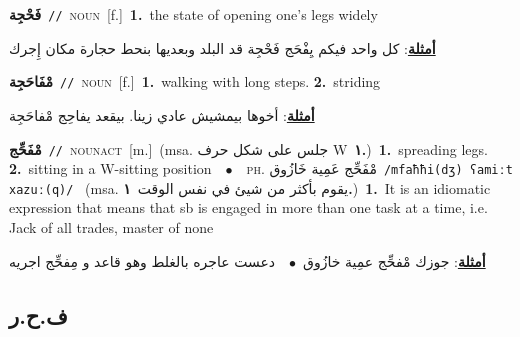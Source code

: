 \documentclass[10pt,a4paper,twoside]{article} %
\begin{document}
\begin{multicols}{2}
{{{{{{{{{{{{{{\setlength\topsep{0pt}\textbf{\foreignlanguage{arabic}{فَحْجِة}}\ {\color{gray}\texttt{//}\color{black}}\ \textsc{noun}\ [f.]\ \textbf{1.}~the state of opening one's legs widely\  \begin{flushright}\color{gray}\foreignlanguage{arabic}{\textbf{\underline{\foreignlanguage{arabic}{أمثلة}}}: كل واحد فيكم يِفْحَج فَحْجِة قد البلد وبعديها بنحط حجارة مكان إِجرك}\end{flushright}\color{black}} \vspace{2mm}

{\setlength\topsep{0pt}\textbf{\foreignlanguage{arabic}{مْفَاحَجِة}}\ {\color{gray}\texttt{//}\color{black}}\ \textsc{noun}\ [f.]\ \textbf{1.}~walking with long steps.  \textbf{2.}~striding\  \begin{flushright}\color{gray}\foreignlanguage{arabic}{\textbf{\underline{\foreignlanguage{arabic}{أمثلة}}}: أخوها بيمشيش عادي زينا. بيقعد يفاحِج مْفاحَجِة}\end{flushright}\color{black}} \vspace{2mm}

{\setlength\topsep{0pt}\textbf{\foreignlanguage{arabic}{مْفَحِّج}}\ {\color{gray}\texttt{//}\color{black}}\ \textsc{noun\textunderscore act}\ [m.]\ \color{gray}(msa. \foreignlanguage{arabic}{جلس على شكل حرف} W~\foreignlanguage{arabic}{\textbf{١.}})\color{black}\ \textbf{1.}~spreading legs.  \textbf{2.}~sitting in a W-sitting position\ \ $\bullet$\ \ \textsc{ph.} \color{gray} \foreignlanguage{arabic}{مْفَحِّج عَمِية خَازُوق}\color{black}\ {\color{gray}\texttt{/{\sffamily mfaħħi(dʒ) ʕamiːt xazuː(q)}/}\color{black}}\ \color{gray} (msa. \foreignlanguage{arabic}{يقوم بأكثر من شيئ في نفس الوقت}~\foreignlanguage{arabic}{\textbf{١.}})\color{black}\ \textbf{1.}~It is an idiomatic expression that means that sb is engaged in more than one task at a time, i.e. Jack of all trades, master of none\  \begin{flushright}\color{gray}\foreignlanguage{arabic}{\textbf{\underline{\foreignlanguage{arabic}{أمثلة}}}: جوزك مْفحِّج عمِية خازُوق\ $\bullet$\ \  دعست عاجره بالغلط وهو قاعد و مِفحِّج اجريه}\end{flushright}\color{black}} \vspace{2mm}

\vspace{-3mm}
\subsection*{\color{blue}\foreignlanguage{arabic}{ف.ح.ر}\color{blue}{}} 

}}}}}}}}}}}}}
\end{multicols}
\end{document}
